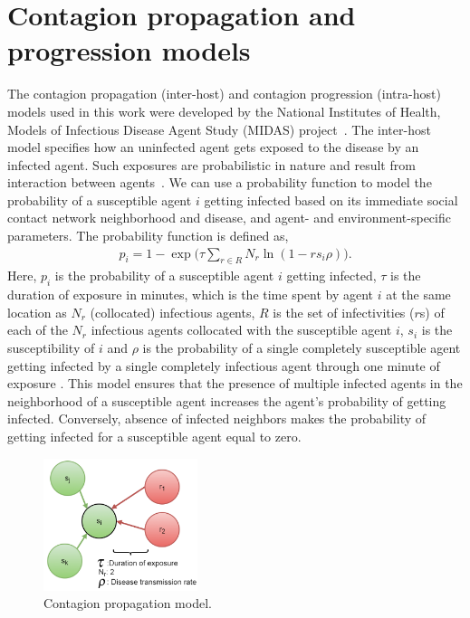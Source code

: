 \documentclass[doublespace,draft]{VTthesis}
\begin{document}
    \section{Contagion propagation and progression models}
    The contagion propagation (inter-host) and contagion progression (intra-host) models used in this work were developed by the National Institutes of Health, Models of Infectious Disease Agent Study (MIDAS) project~\cite{nih09midas}. The inter-host model specifies how an uninfected agent gets exposed to the disease by an infected agent. Such exposures are probabilistic in nature and result from interaction between agents~\cite{barrett2006modeling}. We can use a probability function to model the probability of a susceptible agent $i$ getting infected based on its immediate social contact network neighborhood and disease, and agent- and environment-specific parameters. The probability function is defined as,
    \begin{align}
    p_i = 1 - \exp \Bigg(  \tau \sum_{r \in R} N_r \ln (1-r s_i \rho) \Bigg).
    \label{eqn:1}
    \end{align}
    Here, $p_i$ is the probability of a susceptible agent $i$ getting infected, $\tau$ is the duration of exposure in minutes, which is the time spent by agent $i$ at the same location as $N_r$ (collocated) infectious agents, $R$ is the set of infectivities ($r$s) of each of the $N_r$ infectious agents collocated with the susceptible agent $i$, $s_i$ is the susceptibility of $i$ and $\rho$ is the probability of a single completely susceptible agent getting infected by a single completely infectious agent through one minute of exposure \cite{barrett2007modeling}. This model ensures that the presence of multiple infected agents in the neighborhood of a susceptible agent increases the agent's probability of getting infected. Conversely, absence of infected neighbors makes the probability of getting infected for a susceptible agent equal to zero. 
    \begin{figure}
    \centering
    \includegraphics[width=0.4\textwidth]{figures/dpm.png}
    \caption{Contagion propagation model.}
    \label{fig:dpm}
    \end{figure}
    
\end{document}
